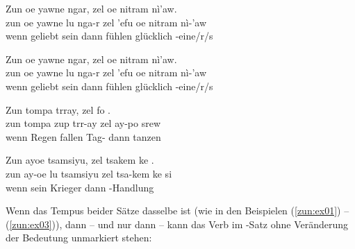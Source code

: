 \begin{interlin} \label{zun:ex01}
	\glll \Npawl{}Zun oe yawne  ngar, zel  oe nitram nì'aw. \\
	zun oe yawne lu nga-r zel 'efu oe nitram nì-'aw \\
	wenn  geliebt sein  dann fühlen  glücklich -eine/r/s  \\
\end{interlin}

\begin{interlin} 
	\glll \Npawl{}Zun oe yawne  ngar, zel  oe nitram nì'aw. \\
	zun oe yawne lu nga-r zel 'efu oe nitram nì-'aw \\
	wenn  geliebt sein  dann fühlen  glücklich -eine/r/s  \\
\end{interlin}

\begin{interlin} \label{zun:ex03}
	\glll \Npawl{}Zun tompa  trray, zel fo . \\
	zun tompa zup trr-ay zel ay-po srew \\
	wenn Regen fallen Tag- dann  tanzen  \\
\end{interlin}

\begin{interlin}
	\glll \Npawl{}Zun ayoe  tsamsiyu, zel tsakem ke . \\
	zun ay-oe lu tsamsiyu zel tsa-kem ke si \\
	wenn  sein Krieger dann -Handlung    \\
\end{interlin}

\noindent Wenn das Tempus beider Sätze dasselbe ist (wie in den Beispielen (\ref{zun:ex01}) -- (\ref{zun:ex03})), dann -- und nur dann -- kann das Verb im -Satz ohne Veränderung der Bedeutung unmarkiert stehen:

